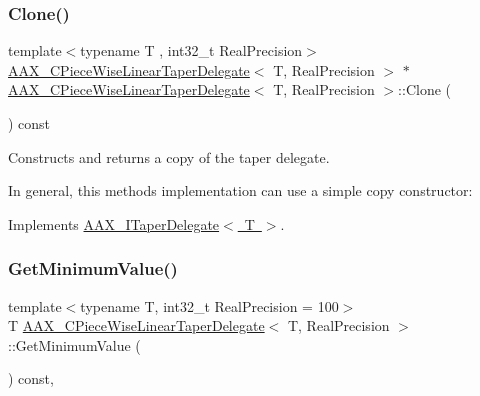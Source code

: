 \subsubsection{\texorpdfstring{Clone()}{Clone()}}
{\footnotesize\ttfamily template$<$typename T , int32\+\_\+t Real\+Precision$>$ \\
\mbox{\hyperlink{a01553}{A\+A\+X\+\_\+\+C\+Piece\+Wise\+Linear\+Taper\+Delegate}}$<$ T, Real\+Precision $>$ $\ast$ \mbox{\hyperlink{a01553}{A\+A\+X\+\_\+\+C\+Piece\+Wise\+Linear\+Taper\+Delegate}}$<$ T, Real\+Precision $>$\+::Clone (\begin{DoxyParamCaption}{ }\end{DoxyParamCaption}) const\hspace{0.3cm}{\ttfamily [virtual]}}



Constructs and returns a copy of the taper delegate. 

In general, this method\textquotesingle{}s implementation can use a simple copy constructor\+:


\begin{DoxyCode}{0}
\DoxyCodeLine{\textcolor{keyword}{}\{}
\DoxyCodeLine{\}}
\end{DoxyCode}
 

Implements \mbox{\hyperlink{a01881_a80ce054ca716147155fe0682adf4e469}{A\+A\+X\+\_\+\+I\+Taper\+Delegate$<$ T $>$}}.

\mbox{\label{a01553_a3e136c26307ec35f70a38fb15b0480ba}} 
\subsubsection{\texorpdfstring{GetMinimumValue()}{GetMinimumValue()}}
{\footnotesize\ttfamily template$<$typename T, int32\+\_\+t Real\+Precision = 100$>$ \\
T \mbox{\hyperlink{a01553}{A\+A\+X\+\_\+\+C\+Piece\+Wise\+Linear\+Taper\+Delegate}}$<$ T, Real\+Precision $>$\+::Get\+Minimum\+Value (\begin{DoxyParamCaption}{ }\end{DoxyParamCaption}) const\hspace{0.3cm}{\ttfamily [inline]}, {\ttfamily [virtual]}}



